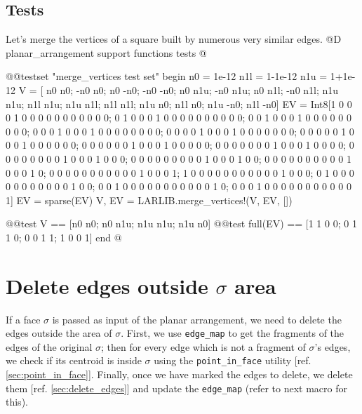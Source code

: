 \subsection{Tests}
Let's merge the vertices of a square built by numerous
very similar edges.
@D planar\_arrangement support functions tests
@{@@testset "merge_vertices test set" begin
    n0 = 1e-12
    n1l = 1-1e-12
    n1u = 1+1e-12
    V = [ n0  n0; -n0  n0;  n0 -n0; -n0 -n0;
          n0 n1u; -n0 n1u;  n0 n1l; -n0 n1l;
         n1u n1u; n1l n1u; n1u n1l; n1l n1l;
         n1u  n0; n1l  n0; n1u -n0; n1l -n0]
    EV = Int8[1 0 0 0 1 0 0 0 0 0 0 0 0 0 0 0;
              0 1 0 0 0 1 0 0 0 0 0 0 0 0 0 0;
              0 0 1 0 0 0 1 0 0 0 0 0 0 0 0 0;
              0 0 0 1 0 0 0 1 0 0 0 0 0 0 0 0;
              0 0 0 0 1 0 0 0 1 0 0 0 0 0 0 0;
              0 0 0 0 0 1 0 0 0 1 0 0 0 0 0 0;
              0 0 0 0 0 0 1 0 0 0 1 0 0 0 0 0;
              0 0 0 0 0 0 0 1 0 0 0 1 0 0 0 0;
              0 0 0 0 0 0 0 0 1 0 0 0 1 0 0 0;
              0 0 0 0 0 0 0 0 0 1 0 0 0 1 0 0;
              0 0 0 0 0 0 0 0 0 0 1 0 0 0 1 0;
              0 0 0 0 0 0 0 0 0 0 0 1 0 0 0 1;
              1 0 0 0 0 0 0 0 0 0 0 0 1 0 0 0;
              0 1 0 0 0 0 0 0 0 0 0 0 0 1 0 0;
              0 0 1 0 0 0 0 0 0 0 0 0 0 0 1 0;
              0 0 0 1 0 0 0 0 0 0 0 0 0 0 0 1]
    EV = sparse(EV)
    V, EV = LARLIB.merge_vertices!(V, EV, [])

    @@test V == [n0 n0; n0 n1u; n1u n1u; n1u n0]
    @@test full(EV) == [1 1 0 0;
                       0 1 1 0;
                       0 0 1 1;
                       1 0 0 1]
end
@}



\section{Delete edges outside $\sigma$ area}

If a face $\sigma$ is passed as input of the planar arrangement,
we need to delete the edges outside the area of $\sigma$. 
First, we use \texttt{edge\_map} to get the fragments of the edges of the original $\sigma$;
then for every edge which is not a fragment of $\sigma$'s edges, we check if its centroid
is inside $\sigma$ using the \texttt{point\_in\_face} utility [ref. \ref{sec:point_in_face}].
Finally, once we have marked the edges to delete, we delete them [ref. \ref{sec:delete_edges}] 
and update the \texttt{edge\_map} (refer to next macro for this).

